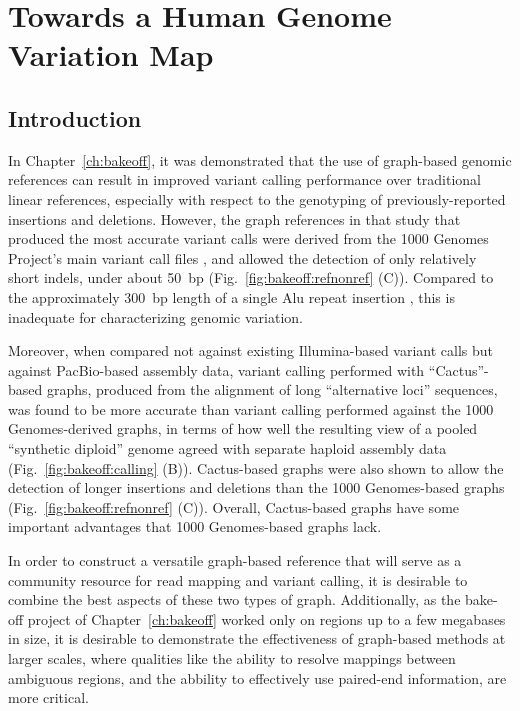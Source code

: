 \chapter{Towards a Human Genome Variation Map}
\label{ch:hgvm}

\section{Introduction}

In Chapter~\ref{ch:bakeoff}, it was demonstrated that the use of graph-based genomic references can result in improved variant calling performance over traditional linear references, especially with respect to the genotyping of previously-reported insertions and deletions. However, the graph references in that study that produced the most accurate variant calls were derived from the 1000 Genomes Project's main variant call files \cite{10002015global}, and allowed the detection of only relatively short indels, under about 50~bp (Fig.~\ref{fig:bakeoff:refnonref} (C)). Compared to the approximately 300~bp length of a single Alu repeat insertion \cite{weiner1980abundant}, this is inadequate for characterizing genomic variation.

Moreover, when compared not against existing Illumina-based variant calls but against PacBio-based assembly data, variant calling performed with ``Cactus''-based graphs, produced from the alignment of long ``alternative loci'' sequences, was found to be more accurate than variant calling performed against the 1000 Genomes-derived graphs, in terms of how well the resulting view of a pooled ``synthetic diploid'' genome agreed with separate haploid assembly data (Fig.~\ref{fig:bakeoff:calling} (B)). Cactus-based graphs were also shown to allow the detection of longer insertions and deletions than the 1000 Genomes-based graphs (Fig.~\ref{fig:bakeoff:refnonref} (C)). Overall, Cactus-based graphs have some important advantages that 1000 Genomes-based graphs lack.

In order to construct a versatile graph-based reference that will serve as a community resource for read mapping and variant calling, it is desirable to combine the best aspects of these two types of graph. Additionally, as the bake-off project of Chapter~\ref{ch:bakeoff} worked only on regions up to a few megabases in size, it is desirable to demonstrate the effectiveness of graph-based methods at larger scales, where qualities like the ability to resolve mappings between ambiguous regions, and the abbility to effectively use paired-end information, are more critical.

